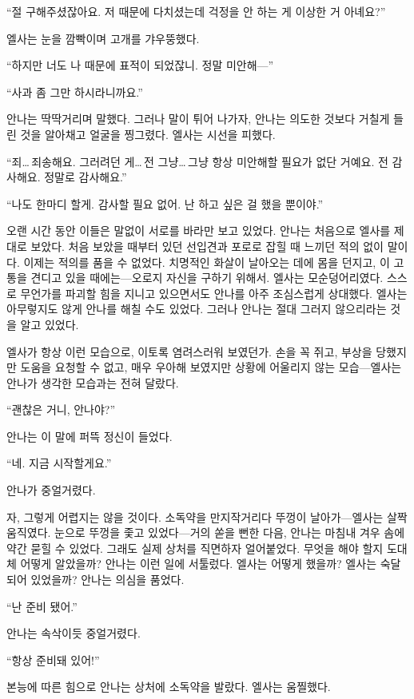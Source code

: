``절 구해주셨잖아요. 저 때문에 다치셨는데 걱정을 안 하는 게 이상한 거 아녜요?''

엘사는 눈을 깜빡이며 고개를 갸우뚱했다.

``하지만 너도 나 때문에 표적이 되었잖니. 정말 미안해—''

``사과 좀 그만 하시라니까요.''

안나는 딱딱거리며 말했다. 그러나 말이 튀어 나가자, 안나는 의도한 것보다 거칠게 들린 것을 알아채고 얼굴을 찡그렸다. 엘사는 시선을 피했다.

``죄\ldots\,죄송해요. 그러려던 게\ldots\,전 그냥\ldots\,그냥 항상 미안해할 필요가 없단 거예요. 전 감사해요. 정말로 감사해요.''

`` 나도 한마디 할게. 감사할 필요 없어. 난 하고 싶은 걸 했을 뿐이야.''

오랜 시간 동안 이들은 말없이 서로를 바라만 보고 있었다. 안나는 처음으로 엘사를 제대로 보았다. 처음 보았을 때부터 있던 선입견과 포로로 잡힐 때 느끼던 적의 없이 말이다. 이제는 적의를 품을 수 없었다. 치명적인 화살이 날아오는 데에 몸을 던지고, 이 고통을 견디고 있을 때에는—오로지 자신을 구하기 위해서. 엘사는 모순덩어리였다. 스스로 무언가를 파괴할 힘을 지니고 있으면서도 안나를 아주 조심스럽게 상대했다. 엘사는 아무렇지도 않게 안나를 해칠 수도 있었다. 그러나 안나는 절대 그러지 않으리라는 것을 알고 있었다.

엘사가 항상 이런 모습으로, 이토록 염려스러워 보였던가. 손을 꼭 쥐고, 부상을 당했지만 도움을 요청할 수 없고, 매우 우아해 보였지만 상황에 어울리지 않는 모습—엘사는 안나가 생각한 모습과는 전혀 달랐다.

``괜찮은 거니, 안나야?''

안나는 이 말에 퍼뜩 정신이 들었다.

``네. 지금 시작할게요.''

안나가 중얼거렸다.

자, 그렇게 어렵지는 않을 것이다. 소독약을 만지작거리다 뚜껑이 날아가—엘사는 살짝 움직였다. 눈으로 뚜껑을 좇고 있었다—거의 쏟을 뻔한 다음, 안나는 마침내 겨우 솜에 약간 묻힐 수 있었다. 그래도 실제 상처를 직면하자 얼어붙었다. 무엇을 해야 할지 도대체 어떻게 알았을까? 안나는 이런 일에 서툴렀다. 엘사는 어떻게 했을까? 엘사는 숙달되어 있었을까? 안나는 의심을 품었다.

``난 준비 됐어.''

안나는 속삭이듯 중얼거렸다.

``항상 준비돼 있어!''

본능에 따른 힘으로 안나는 상처에 소독약을 발랐다. 엘사는 움찔했다.

